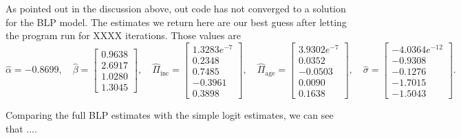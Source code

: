 \documentclass[a4paper,11pt]{article}
\begin{document}
As pointed out in the discussion above, out code has not converged to a solution for the BLP model. The estimates we return here are our best guess after letting the program run for XXXX iterations. Those values are
\[
\hat\alpha = -0.8699, \quad
\hat\beta = \left[ \begin{array}{r} 
0.9638 \\ 2.6917 \\ 1.0280 \\ 1.3045
\end{array}\right],
\quad
\hat\Pi_{\mathrm{inc}} = \left[ \begin{array}{r}
1.3283e^{-7} \\ 0.2348 \\ 0.7485 \\ -0.3961 \\ 0.3898
\end{array}\right],
\quad
\hat\Pi_{\mathrm{age}} = \left[ \begin{array}{r}
3.9302e^{-7} \\ 0.0352 \\ -0.0503 \\ 0.0090 \\ 0.1638
\end{array}\right],
\quad
\hat\sigma = \left[ \begin{array}{r}
-4.0364e^{-12} \\ -0.9308 \\ -0.1276 \\ -1.7015 \\ -1.5043
\end{array}\right].
\]

Comparing the full BLP estimates with the simple logit estimates, we can see that ....

\clearpage

\appendix
\end{document}

